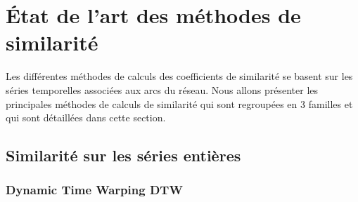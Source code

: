 \documentclass[onecolumn, 12pt]{book}
\begin{document}
%


\section{\'Etat de l'art des m\'ethodes de similarit\'e}
Les diff\'erentes m\'ethodes de calculs des coefficients de similarit\'e se basent sur les s\'eries temporelles associ\'ees aux arcs du r\'eseau.
Nous allons pr\'esenter les principales m\'ethodes de calculs de similarit\'e qui sont regroup\'ees en $3$ familles et qui sont d\'etaill\'ees dans cette section.
\subsection{ Similarit\'e sur les s\'eries enti\`eres}
	\label{seriesEntieres}
	
	\subsubsection{Dynamic Time Warping  DTW}
		
\end{document}

